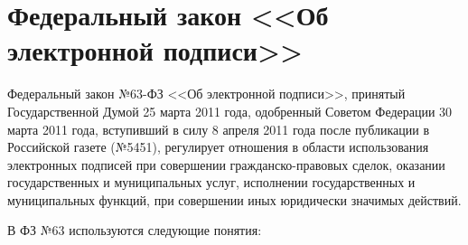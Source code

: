 \section{Федеральный закон <<Об электронной подписи>>} \label{rights_63}

Федеральный закон №63-ФЗ <<Об электронной подписи>>, принятый Государственной Думой 25 марта 2011 года, одобренный Советом Федерации 30 марта 2011 года, вступивший в силу 8 апреля 2011 года после публикации в Российской газете (№5451), регулирует отношения  в области использования электронных подписей при совершении гражданско-правовых сделок, оказании государственных и муниципальных услуг, исполнении государственных и муниципальных функций, при совершении иных юридически значимых действий.

\vspace{\baselineskip}
В ФЗ №63 используются следующие понятия:
